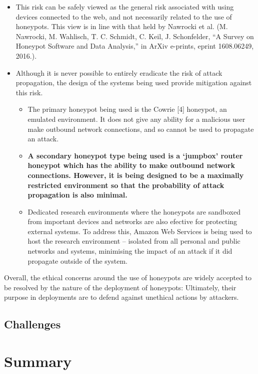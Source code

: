 		\begin{itemize}
		\item This risk can be safely viewed as the general risk associated with using devices connected to the web, and not necessarily related to the use of honeypots. This view is in line with that held by Nawrocki et al. (M. Nawrocki, M. Wahlisch, T. C. Schmidt, C. Keil, J. Schonfelder, “A Survey on Honeypot Software and Data Analysis,” in ArXiv e-prints, eprint 1608.06249, 2016.).
		
		\item Although it is never possible to entirely eradicate the risk of attack propagation, the design of the systems being used provide mitigation against this risk.
			\begin{itemize}

			\item The primary honeypot being used is the Cowrie [4] honeypot, an emulated	environment. It does not give any ability for a malicious user make outbound network connections, and so cannot be used to propagate an attack.
			\item \textbf{A secondary honeypot type being used is a ‘jumpbox’ router honeypot which	has the ability to make outbound network connections. However, it is being designed to be a maximally restricted environment so that the probability of attack propagation is also minimal.}
		
			\item Dedicated research environments where the honeypots are sandboxed from important devices and networks are also efective for protecting external systems. To address this, Amazon Web Services is being used to host the research environment – isolated from all personal and public networks and systems, minimising the impact of an attack if it did propagate outside of the system.
			\end{itemize}
		\end{itemize}		
	
	Overall, the ethical concerns around the use of honeypots are widely accepted to be resolved by the nature of the deployment of honeypots: Ultimately, their purpose in deployments are to defend against unethical actions by attackers.
	
	\subsection{Challenges}



\section{Summary}